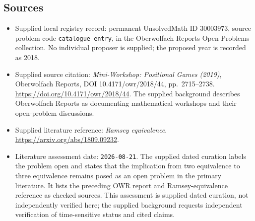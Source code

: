 \documentclass[11pt]{article}
\begin{document}
\subsection{Sources}
\begin{itemize}
\item Supplied local registry record: permanent UnsolvedMath ID \(30003973\), source problem code \texttt{catalogue entry}, in the Oberwolfach Reports Open Problems collection. No individual proposer is supplied; the proposed year is recorded as 2018.
\item Supplied source citation: \emph{Mini-Workshop: Positional Games (2019)}, Oberwolfach Reports, DOI 10.4171/owr/2018/44, pp.\ 2715--2738. \url{https://doi.org/10.4171/owr/2018/44}. The supplied background describes Oberwolfach Reports as documenting mathematical workshops and their open-problem discussions.
\item Supplied literature reference: \emph{Ramsey equivalence}. \url{https://arxiv.org/abs/1809.09232}.
\item Literature assessment date: \texttt{2026-08-21}. The supplied dated curation labels the problem open and states that the implication from two equivalence to three equivalence remains posed as an open problem in the primary literature. It lists the preceding OWR report and Ramsey-equivalence reference as checked sources. This assessment is supplied dated curation, not independently verified here; the supplied background requests independent verification of time-sensitive status and cited claims.
\end{itemize}
\end{document}
